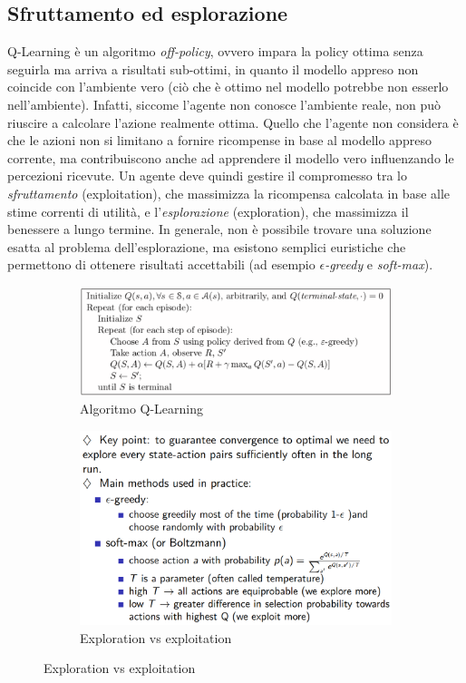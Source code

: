 \documentclass[11pt,oneside]{book}
\begin{document}
\subsection{Sfruttamento ed esplorazione}
Q-Learning è un algoritmo \textit{off-policy}, ovvero impara la policy ottima senza seguirla ma arriva a risultati sub-ottimi, in quanto il modello appreso non coincide con l'ambiente vero (ciò che è ottimo nel modello potrebbe non esserlo nell'ambiente). Infatti, siccome l'agente non conosce l'ambiente reale, non può riuscire a calcolare l'azione realmente ottima. Quello che l'agente non considera è che le azioni non si limitano a fornire ricompense in base al modello appreso corrente, ma contribuiscono anche ad apprendere il modello vero influenzando le percezioni ricevute. Un agente deve quindi gestire il compromesso tra lo \textit{sfruttamento} (exploitation), che massimizza la ricompensa calcolata in base alle stime correnti di utilità, e l'\textit{esplorazione} (exploration), che massimizza il benessere a lungo termine. In generale, non è possibile trovare una soluzione esatta al problema dell'esplorazione, ma esistono semplici euristiche che permettono di ottenere risultati accettabili (ad esempio \textit{$\epsilon$-greedy} e \textit{soft-max}).
\begin{figure}[htp]
	\begin{subfigure}{0.49\textwidth}
	    \centering
		\includegraphics[width=\textwidth, height=\textheight, keepaspectratio]{q-learning1.png}
		\caption{Algoritmo Q-Learning}
	\end{subfigure}
	\hfill
	\begin{subfigure}{0.49\textwidth}
	    \centering
		\includegraphics[width=\textwidth, height=\textheight, keepaspectratio]{q-learning2.png}
		\caption{Exploration vs exploitation}
	\end{subfigure}
\end{figure}
\end{document}
